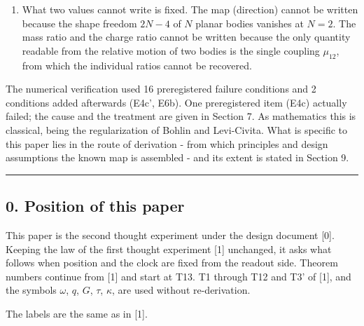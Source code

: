 \documentclass[
  a4paper,
]{article}
\begin{document}
\begin{enumerate}
  collision orbit with nonzero coupling (\(L=0\), \(\mu\neq0\)) cannot
  be represented. The real quadratic map \(Y=\Phi(X)\) and the clock
  \(dt\propto r\,ds\) have the same structure as the Levi-Civita type
  regularizing map written in real coordinates, but the collision orbits
  that regularization treats lie outside this model.
\item
  What two values cannot write is fixed. The map (direction) cannot be
  written because the shape freedom \(2N-4\) of \(N\) planar bodies
  vanishes at \(N=2\). The mass ratio and the charge ratio cannot be
  written because the only quantity readable from the relative motion of
  two bodies is the single coupling \(\mu_{12}\), from which the
  individual ratios cannot be recovered.
\end{enumerate}

The numerical verification used 16 preregistered failure conditions and
2 conditions added afterwards (E4c', E6b). One preregistered item (E4c)
actually failed; the cause and the treatment are given in Section 7. As
mathematics this is classical, being the regularization of Bohlin and
Levi-Civita. What is specific to this paper lies in the route of
derivation - from which principles and design assumptions the known map
is assembled - and its extent is stated in Section 9.

\begin{center}\rule{0.5\linewidth}{0.5pt}\end{center}

\subsection{0. Position of this paper}\label{position-of-this-paper}

This paper is the second thought experiment under the design document
{[}0{]}. Keeping the law of the first thought experiment {[}1{]}
unchanged, it asks what follows when position and the clock are fixed
from the readout side. Theorem numbers continue from {[}1{]} and start
at T13. T1 through T12 and T3' of {[}1{]}, and the symbols \(\omega\),
\(q\), \(G\), \(\tau\), \(\kappa\), are used without re-derivation.

The labels are the same as in {[}1{]}.
\end{document}
